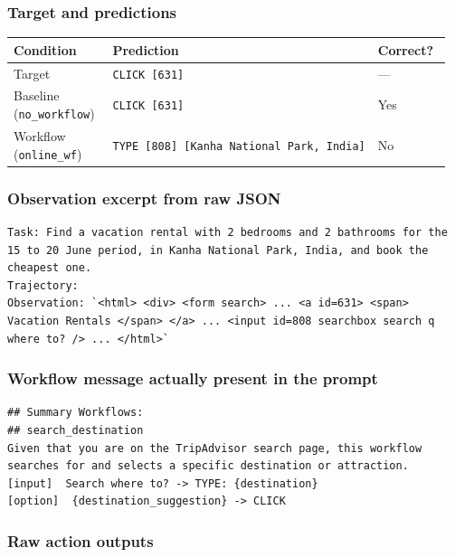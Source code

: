\subsubsection{Target and
predictions}

{\def\LTcaptype{} %
\begin{longtable}[]{@{}>{\raggedright\arraybackslash}p{0.28\linewidth}>{\raggedright\arraybackslash}p{0.46\linewidth}>{\raggedright\arraybackslash}p{0.22\linewidth}@{}}
\toprule\noalign{}
Condition & Prediction & Correct? \\
\midrule\noalign{}
\endhead
\bottomrule\noalign{}
\endlastfoot
Target & \texttt{CLICK\ {[}631{]}} & --- \\
Baseline (\texttt{no\_workflow}) & \texttt{CLICK\ {[}631{]}} & Yes \\
Workflow (\texttt{online\_wf}) &
\texttt{TYPE\ {[}808{]}\ {[}Kanha\ National\ Park,\ India{]}} & No \\
\end{longtable}
}

\subsubsection{Observation excerpt from raw
JSON}

\begin{verbatim}
Task: Find a vacation rental with 2 bedrooms and 2 bathrooms for the 15 to 20 June period, in Kanha National Park, India, and book the cheapest one.
Trajectory:
Observation: `<html> <div> <form search> ... <a id=631> <span> Vacation Rentals </span> </a> ... <input id=808 searchbox search q where to? /> ... </html>`
\end{verbatim}

\subsubsection{Workflow message actually present in the
prompt}

\begin{verbatim}
## Summary Workflows:
## search_destination
Given that you are on the TripAdvisor search page, this workflow searches for and selects a specific destination or attraction.
[input]  Search where to? -> TYPE: {destination}
[option]  {destination_suggestion} -> CLICK
\end{verbatim}

\subsubsection{Raw action outputs}

